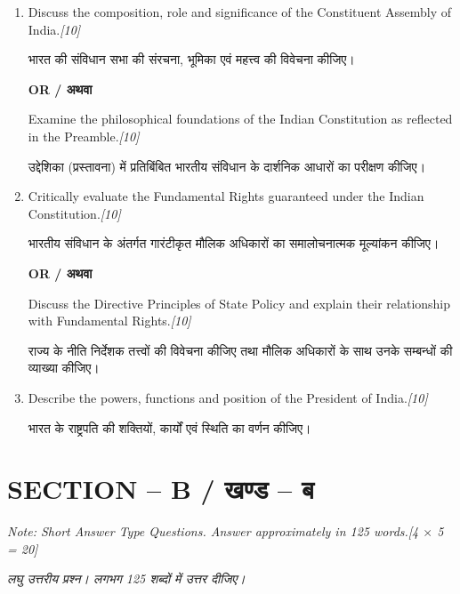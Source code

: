 \documentclass[11pt,a4paper]{article}
\newcommand{\pts}[1]{\hfill \textit{[#1]}}
\begin{document}
\begin{enumerate}[label=\textbf{\arabic*.},leftmargin=*,itemsep=12pt]

  \item Discuss the composition, role and significance of the Constituent Assembly of India.\pts{10}
  
  भारत की संविधान सभा की संरचना, भूमिका एवं महत्त्व की विवेचना कीजिए।

  \begin{center}\textbf{OR / अथवा}\end{center}

  Examine the philosophical foundations of the Indian Constitution as reflected in the Preamble.\pts{10}
  
  उद्देशिका (प्रस्तावना) में प्रतिबिंबित भारतीय संविधान के दार्शनिक आधारों का परीक्षण कीजिए।

  \item Critically evaluate the Fundamental Rights guaranteed under the Indian Constitution.\pts{10}
  
  भारतीय संविधान के अंतर्गत गारंटीकृत मौलिक अधिकारों का समालोचनात्मक मूल्यांकन कीजिए।

  \begin{center}\textbf{OR / अथवा}\end{center}

  Discuss the Directive Principles of State Policy and explain their relationship with Fundamental Rights.\pts{10}
  
  राज्य के नीति निर्देशक तत्त्वों की विवेचना कीजिए तथा मौलिक अधिकारों के साथ उनके सम्बन्धों की व्याख्या कीजिए।

  \item Describe the powers, functions and position of the President of India.\pts{10}
  
  भारत के राष्ट्रपति की शक्तियों, कार्यों एवं स्थिति का वर्णन कीजिए।

\end{enumerate}

\bigskip

\section*{SECTION -- B / खण्ड -- ब}
\noindent \textit{Note: Short Answer Type Questions. Answer approximately in 125 words.}\pts{4 $\times$ 5 = 20}

\noindent \textit{लघु उत्तरीय प्रश्न। लगभग 125 शब्दों में उत्तर दीजिए।}
\end{document}
